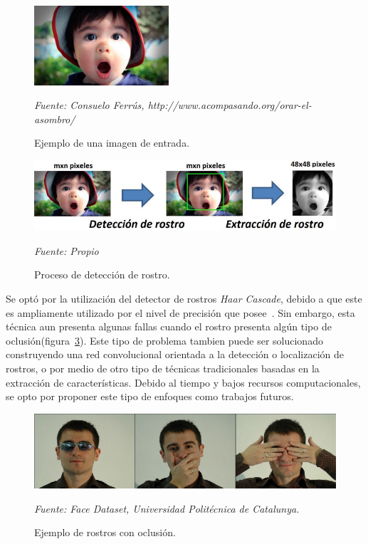 \begin{figure}[H]
		\centering
		\includegraphics[width=50mm]{./Imagenes/imagen_entrada.png}
		\caption{Ejemplo de una imagen de entrada.}
		\vspace{0.15cm}
		\textit{Fuente: Consuelo Ferrús, http://www.acompasando.org/orar-el-asombro/}
		\label{fig:imagen_entrada}
\end{figure}


\begin{figure}[H]
		\centering
		\includegraphics[width=140mm]{./Imagenes/proceso_deteccion.png}
		\caption{Proceso de detección de rostro.}
		\vspace{0.15cm}
		\textit{Fuente: Propio}
		\label{fig:proceso_deteccion}
\end{figure}

Se optó por la utilización del detector de rostros \textit{Haar Cascade}, debido a que este es ampliamente utilizado por el nivel de precisión que posee~\cite{6russakovsky2015imagenet}. Sin embargo, esta técnica aun presenta algunas fallas cuando el rostro presenta algún tipo de oclusión(figura~\ref{fig:oclussion}). Este tipo de problema tambien puede ser solucionado construyendo una red convolucional orientada a la detección o localización de rostros, o por medio de otro tipo de técnicas tradicionales basadas en la extracción de características. Debido al tiempo y bajos recursos computacionales, se opto por proponer este tipo de enfoques como trabajos futuros.

\begin{figure}[H]
		\centering
		\includegraphics[width=130mm]{./Imagenes/oclussion.jpeg}
		\caption{Ejemplo de rostros con oclusión.}
		\vspace{0.15cm}
		\textit{Fuente: Face Dataset, Universidad Politécnica de Catalunya.}
		\label{fig:oclussion}
\end{figure}

